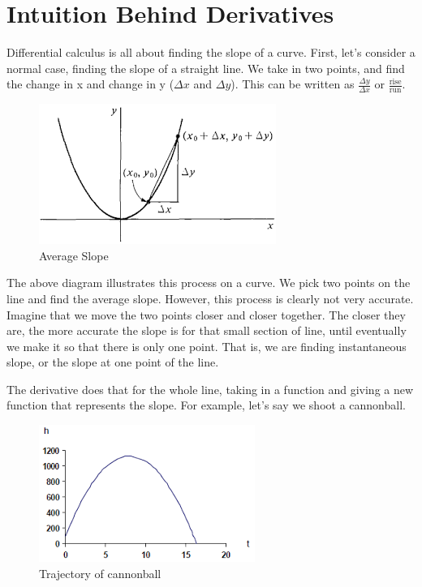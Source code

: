 \chapter{Intuition Behind Derivatives}
Differential calculus is all about finding the slope of a curve. 
First, let's consider a normal case, finding the slope of a straight line. 
We take in two points, and find the change in x and change in y ($\Delta x$ and $\Delta y$). 
This can be written as $\frac{\Delta y}{\Delta x}$ or $\frac{\text{rise}}{\text{run}}$.

\begin{figure}[H]
\caption{Average Slope}
\includegraphics[scale=1]{../download.png}
\end{figure}

The above diagram illustrates this process on a curve. 
We pick two points on the line and find the average slope. 
However, this process is clearly not very accurate. 
Imagine that we move the two points closer and closer together. 
The closer they are, the more accurate the slope is for that small section of line, until eventually we make it so that there is only one point. 
That is, we are finding instantaneous slope, or the slope at one point of the line.

The derivative does that for the whole line, taking in a function and giving a new function that represents the slope. 
For example, let's say we shoot a cannonball.

\begin{figure}[H]
\caption{Trajectory of cannonball}
\includegraphics[scale=1]{../cannonball.png}
\end{figure}

